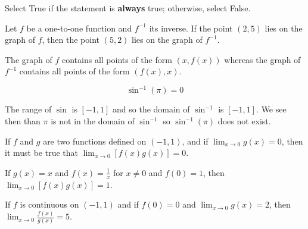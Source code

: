 \documentclass{ximera}
\author{Nela Lakos \and Kyle Parsons}
\begin{document}
\begin{exercise}

Select True if the statement is \textbf{always} true; otherwise, select False.

Let $f$ be a one-to-one function and $f^{-1}$ its inverse.  If the point $(2,5)$ lies on the graph of $f$, then the point $(5,2)$ lies on the graph of $f^{-1}$.

\begin{multipleChoice}
\end{multipleChoice}

\begin{feedback}
The graph of $f$ contains all points of the form $\left(x,f(x)\right)$ whereas the graph of $f^{-1}$ contains all points of the form $\left(f(x),x\right)$.
\end{feedback}

\begin{exercise}

\[
\sin^{-1}(\pi) = 0
\]

\begin{multipleChoice}
\end{multipleChoice}

\begin{feedback}
The range of $\sin$ is $\left[-1,1\right]$ and so the domain of $\sin^{-1}$ is $\left[-1,1\right]$.  We see then than $\pi$ is not in the domain of $\sin^{-1}$ so $\sin^{-1}(\pi)$ does not exist.
\end{feedback}

\begin{exercise}

If $f$ and $g$ are two functions defined on $\left(-1,1\right)$, and if $\lim_{x\to0}g(x) = 0$, then it must be true that $\lim_{x\to0}\left[f(x)g(x)\right]=0$.

\begin{multipleChoice}
\end{multipleChoice}

\begin{feedback}
If $g(x) = x$ and $f(x) = \frac{1}{x}$ for $x\neq0$ and $f(0)=1$, then $\lim_{x\to0}\left[f(x)g(x)\right] = 1$.
\end{feedback}

\begin{exercise}

If $f$ is continuous on $\left(-1,1\right)$ and if $f(0) = 0$ and $\lim_{x\to0}g(x) = 2$, then $\lim_{x\to0}\frac{f(x)}{g(x)} = 5$.


\end{exercise}
\end{exercise}
\end{exercise}
\end{exercise}
\end{document}
